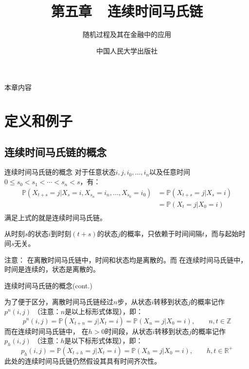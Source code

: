 \documentclass[t]{beamer}
\renewcommand{\Pr}{\mathbb{P}}
\begin{document}
\fontsize{11}{18}\selectfont


\CTEXindent



  \title{第五章~~连续时间马氏链}
\author{随机过程及其在金融中的应用}
\date{中国人民大学出版社}
  \begin{frame}
    \maketitle
  \end{frame}

\begin{frame}{本章内容}
  \begin{multicols}{2}
    \tableofcontents
  \end{multicols}
\end{frame}

\section{定义和例子}

\subsection{连续时间马氏链的概念}
\begin{frame}{连续时间马氏链的概念}
  对于任意状态$i,j,i_0,\ldots,i_{n}$以及任意时间$0\le s_0<s_1<\cdots<s_n<s$，有：
  \[\begin{split}
  \Pr(X_{t+s}=j|X_s=i,X_{s_n}=i_{n},\ldots,X_{s_0}=i_0)&=\Pr(X_{t+s}=j|X_s=i) \\
  &=\Pr(X_{t}=j|X_0=i) \\
  \end{split}\]
  满足上式的就是连续时间马氏链。
  
  从时刻$s$的状态$i$到时刻$(t+s)$的状态$j$的概率，只依赖于时间间隔$t$，而与起始时间$s$无关。

  \begin{block}{注意：}
    在离散时间马氏链中，时间和状态均是离散的。而
  在连续时间马氏链中，{时间是连续的}，{状态是离散的}。
  \end{block}
\end{frame}


\begin{frame}{连续时间马氏链的概念(cont.)}

  为了便于区分，离散时间马氏链经过$n$步，从状态$i$转移到状态$j$的概率记作$p^n(i,j)$ （注意：$n$是以上标形式体现），即：
  \[p^n(i,j)=\Pr(X_{t+{n}}=j|X_t=i)=\Pr(X_{n}=j|X_0=i), \qquad n,t \in\mathbb{Z} \]
  而在连续时间马氏链中，
  在$h>0$时间段，从状态$i$转移到状态$j$的概率记作$p_{h}(i,j)$ （注意：$h$是以下标形式体现），即：
  \[p_{h}(i,j)=\Pr(X_{t+{h}}=j|X_t=i)=\Pr(X_{h}=j|X_0=i), \qquad h,t\in\mathbb{R}^+ \]
  此处的连续时间马氏链仍然假设其具有时间齐次性。
\end{frame}
\end{document}
